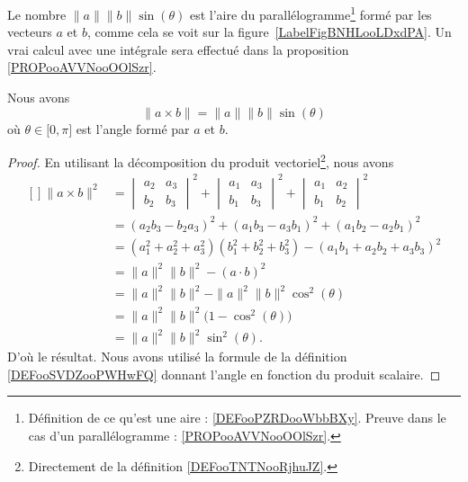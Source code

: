 \newcommand{\CaptionFigBNHLooLDxdPA}{Calculer l'aire d'un parallélogramme.}


\begin{remark}      \label{RemaAireParalProdVect}
	Le nombre \( \| a \|\| b \|\sin(\theta)\) est l'aire du parallélogramme\footnote{Définition de ce qu'est une aire : \ref{DEFooPZRDooWbbBXy}. Preuve dans le cas d'un parallélogramme : \ref{PROPooAVVNooOOlSzr}.} formé par les vecteurs \( a\) et \( b\), comme cela se voit sur la figure~\ref{LabelFigBNHLooLDxdPA}. Un vrai calcul avec une intégrale sera effectué dans la proposition \ref{PROPooAVVNooOOlSzr}.
\end{remark}

\begin{proposition}     \label{PropNormeProdVectoabsint}
	Nous avons
	\begin{equation}
		\| a\times b \|=\| a \|\| b \|\sin(\theta)
	\end{equation}
	où \( \theta\in\mathopen[ 0,\pi \mathclose]\) est l'angle formé par \( a\) et \( b\).
\end{proposition}

\begin{proof}
	En utilisant la décomposition du produit vectoriel\footnote{Directement de la définition \ref{DEFooTNTNooRjhuJZ}.}, nous avons
	\begin{equation}
		\begin{aligned}[]
			\| a\times b \|^2 & =\begin{vmatrix}
				a_2 & a_3 \\
				b_2 & b_3
			\end{vmatrix}^2+\begin{vmatrix}
				a_1 & a_3 \\
				b_1 & b_3
			\end{vmatrix}^2+\begin{vmatrix}
				a_1 & a_2 \\
				b_1 & b_2
			\end{vmatrix}^2 \\
			                  & =(a_2b_3-b_2a_3)^2+(a_1b_3-a_3b_1)^2+(a_1b_2-a_2b_1)^2                                  \\
			                  & =(a_1^2+a_2^2+a_3^2)(b_1^2+b_2^2+b_3^2)-(a_1b_1+a_2b_2+a_3b_3)^2                        \\
			                  & =\| a \|^2\| b \|^2-(a\cdot b)^2                                                        \\
			                  & =\| a \|^2\| b \|^2-\| a \|^2\| b \|^2\cos^2(\theta)                                    \\
			                  & =\| a \|^2\| b \|^2\big( 1-\cos^2(\theta) \big)                                         \\
			                  & =\| a \|^2\| b \|^2\sin^2(\theta).
		\end{aligned}
	\end{equation}
	D'où le résultat. Nous avons utilisé la formule de la définition \eqref{DEFooSVDZooPWHwFQ} donnant l'angle en fonction du produit scalaire.
\end{proof}

